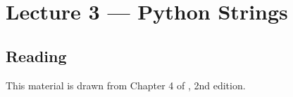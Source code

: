 \documentclass[letterpaper,10pt,english]{sphinxmanual}
\begin{document}
\begin{sphinxVerbatim}[commandchars=\\\{\}]
  
  
  
          
\end{sphinxVerbatim}


\chapter{Lecture 3 — Python Strings}
\label{\detokenize{lecture_notes/lec03_strings:lecture-3-python-strings}}\label{\detokenize{lecture_notes/lec03_strings::doc}}

\section{Reading}
\label{\detokenize{lecture_notes/lec03_strings:reading}}
This material is drawn from Chapter 4 of , 2nd
edition.
\end{document}
